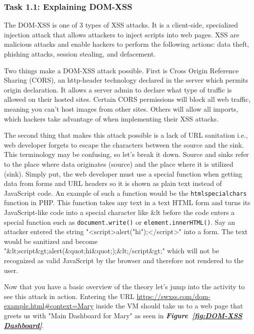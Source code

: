 \documentclass[letterpaper,12pt]{report}
\newcounter{taskset}
\newcounter{action}[taskset]
\begin{document}
\subsubsection*{Task 1.1: Explaining DOM-XSS}

The DOM-XSS is one of 3 types of XSS attacks. It is a client-side, specialized injection attack that allows attackers to inject scripts into web pages. XSS are malicious attacks and enable hackers to perform the following actions: data theft, phishing attacks, session stealing, and defacement.

Two things make a DOM-XSS attack possible. First is Cross Origin Reference Sharing (CORS), an http-header technology declared in the server which permits origin declaration. It allows a server admin to declare what type of traffic is allowed on their hosted sites. Certain CORS permissions will block all web traffic, meaning you can't host images from other sites. Others will allow all imports, which hackers take advantage of when implementing their XSS attacks.

The second thing that makes this attack possible is a lack of URL sanitation i.e., web developer forgets to escape the characters between the source and the sink. This terminology may be confusing, so let's break it down. Source and sinks refer to the place where data originates (source) and the place where it is utilized (sink). Simply put, the web developer must use a special function when getting data from forms and URL headers so it is shown as plain text instead of JavaScript code. An example of such a function would be the \texttt{htmlspecialchars} function in PHP. This function takes any text in a text HTML form and turns its JavaScript-like code into a special character like \&lt before the code enters a special function such as \texttt{document.write()} or \texttt{element.innerHTML()}. Say an attacker entered the string "<script>alert("hi");</script>" into a form. The text would be sanitized and become "\&lt;script\&gt;alert(\&quot;hi\&quot;);\&lt;/script\&gt;" which will not be recognized as valid JavaScript by the browser and therefore not rendered to the user.

\bigskip

Now that you have a basic overview of the theory let's jump into the activity to see this attack in action.
Entering the URL \url{https://swxss.com/dom-example.html#context=Mary} inside the VM should take us to a web page that greets us with "Main Dashboard for Mary" as seen in \textbf{\textit{Figure~\ref{fig:DOM-XSS Dashboard}}}.
\end{document}
